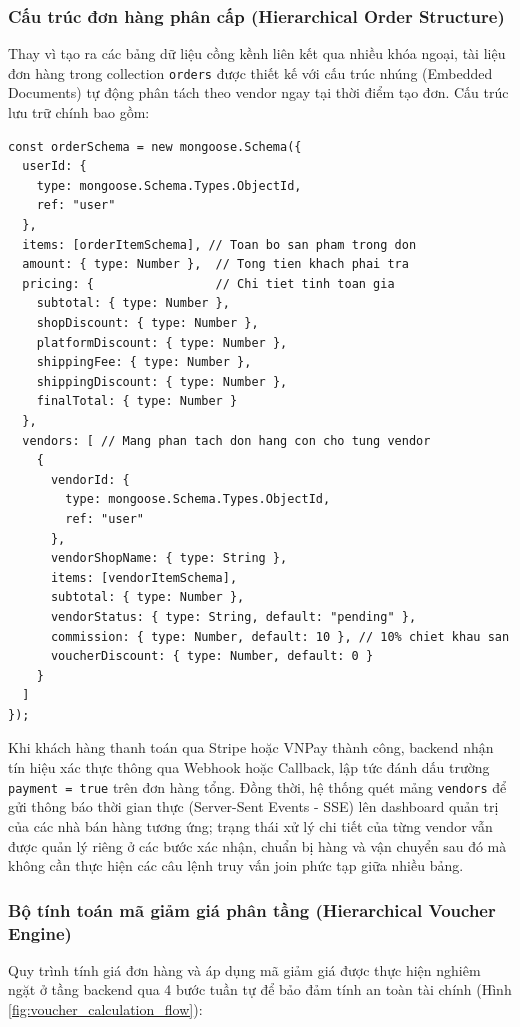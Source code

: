 \documentclass[../DoAn.tex]{subfiles}
\begin{document}
\subsubsection{Cấu trúc đơn hàng phân cấp (Hierarchical Order Structure)}
Thay vì tạo ra các bảng dữ liệu cồng kềnh liên kết qua nhiều khóa ngoại, tài liệu đơn hàng trong collection \texttt{orders} được thiết kế với cấu trúc nhúng (Embedded Documents) tự động phân tách theo vendor ngay tại thời điểm tạo đơn. Cấu trúc lưu trữ chính bao gồm:
\begin{lstlisting}[breaklines=true,basicstyle=\ttfamily\small,columns=fullflexible]
const orderSchema = new mongoose.Schema({
  userId: {
    type: mongoose.Schema.Types.ObjectId,
    ref: "user"
  },
  items: [orderItemSchema], // Toan bo san pham trong don
  amount: { type: Number },  // Tong tien khach phai tra
  pricing: {                 // Chi tiet tinh toan gia
    subtotal: { type: Number },
    shopDiscount: { type: Number },
    platformDiscount: { type: Number },
    shippingFee: { type: Number },
    shippingDiscount: { type: Number },
    finalTotal: { type: Number }
  },
  vendors: [ // Mang phan tach don hang con cho tung vendor
    {
      vendorId: {
        type: mongoose.Schema.Types.ObjectId,
        ref: "user"
      },
      vendorShopName: { type: String },
      items: [vendorItemSchema],
      subtotal: { type: Number },
      vendorStatus: { type: String, default: "pending" },
      commission: { type: Number, default: 10 }, // 10% chiet khau san
      voucherDiscount: { type: Number, default: 0 }
    }
  ]
});
\end{lstlisting}

Khi khách hàng thanh toán qua Stripe hoặc VNPay thành công, backend nhận tín hiệu xác thực thông qua Webhook hoặc Callback, lập tức đánh dấu trường \texttt{payment = true} trên đơn hàng tổng. Đồng thời, hệ thống quét mảng \texttt{vendors} để gửi thông báo thời gian thực (Server-Sent Events - SSE) lên dashboard quản trị của các nhà bán hàng tương ứng; trạng thái xử lý chi tiết của từng vendor vẫn được quản lý riêng ở các bước xác nhận, chuẩn bị hàng và vận chuyển sau đó mà không cần thực hiện các câu lệnh truy vấn join phức tạp giữa nhiều bảng.

\subsubsection{Bộ tính toán mã giảm giá phân tầng (Hierarchical Voucher Engine)}
Quy trình tính giá đơn hàng và áp dụng mã giảm giá được thực hiện nghiêm ngặt ở tầng backend qua 4 bước tuần tự để bảo đảm tính an toàn tài chính (Hình \ref{fig:voucher_calculation_flow}):
\end{document}
